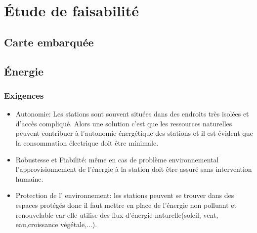 \section{Étude de faisabilité}

\subsection{Carte embarquée}

\subsection{Énergie}

\subsubsection{Exigences}
\begin{itemize}

\item Autonomie: Les stations sont souvent situées dans des endroits tr\`es isol\'{e}es et d'acc\`es compliqu\'e. Alors une solution c'est que les ressources naturelles peuvent contribuer  à l'autonomie \'energ\'{e}tique des stations et il est \'{e}vident que la consommation \'{e}lectrique doit \^etre minimale.

\smallskip \item Robustesse et Fiabilit\'{e}: même en cas de probl\`eme environnemental l'approvisionnement de l'\'{e}nergie \`a la station doit \^etre assur\'{e} sans intervention humaine.

\smallskip \item Protection de l' environnement: les stations peuvent se trouver dans des espaces prot\'{e}g\'{e}s donc il faut mettre en place de l'\'{e}nergie non polluant et renouvelable car elle utilise des flux d'\'{e}nergie naturelle(soleil, vent, eau,croissance v\'{e}g\'{e}tale,...).
\end{itemize}


